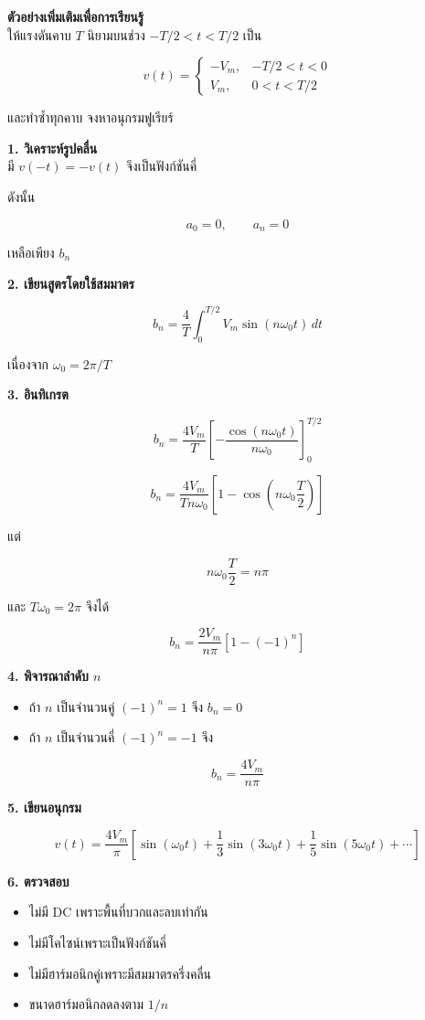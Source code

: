 \textbf{ตัวอย่างเพิ่มเติมเพื่อการเรียนรู้}\\
ให้แรงดันคาบ \(T\) นิยามบนช่วง \(-T/2<t<T/2\) เป็น

\[
v(t)=
\begin{cases}
-V_m, & -T/2<t<0\\
V_m, & 0<t<T/2
\end{cases}
\]

และทำซ้ำทุกคาบ จงหาอนุกรมฟูเรียร์

\textbf{1. วิเคราะห์รูปคลื่น}\\
มี \(v(-t)=-v(t)\) จึงเป็นฟังก์ชันคี่

ดังนั้น

\[
a_0=0,\qquad a_n=0
\]

เหลือเพียง \(b_n\)

\textbf{2. เขียนสูตรโดยใช้สมมาตร}

\[
b_n=\frac{4}{T}\int_0^{T/2}V_m\sin(n\omega_0t)\,dt
\]

เนื่องจาก \(\omega_0=2\pi/T\)

\textbf{3. อินทิเกรต}

\[
b_n=\frac{4V_m}{T}\left[-\frac{\cos(n\omega_0t)}{n\omega_0}\right]_0^{T/2}
\]

\[
b_n=\frac{4V_m}{Tn\omega_0}\left[1-\cos\left(n\omega_0\frac{T}{2}\right)\right]
\]

แต่

\[
n\omega_0\frac{T}{2}=n\pi
\]

และ \(T\omega_0=2\pi\) จึงได้

\[
b_n=\frac{2V_m}{n\pi}\left[1-(-1)^n\right]
\]

\textbf{4. พิจารณาลำดับ \(n\)}

\begin{itemize}
\item
  ถ้า \(n\) เป็นจำนวนคู่ \((-1)^n=1\) จึง \(b_n=0\)
\item
  ถ้า \(n\) เป็นจำนวนคี่ \((-1)^n=-1\) จึง
\end{itemize}

\[
b_n=\frac{4V_m}{n\pi}
\]

\textbf{5. เขียนอนุกรม}

\[
v(t)=\frac{4V_m}{\pi}\left[\sin(\omega_0t)+\frac{1}{3}\sin(3\omega_0t)+\frac{1}{5}\sin(5\omega_0t)+\cdots\right]
\]

\textbf{6. ตรวจสอบ}

\begin{itemize}
\item
  ไม่มี DC เพราะพื้นที่บวกและลบเท่ากัน
\item
  ไม่มีโคไซน์เพราะเป็นฟังก์ชันคี่
\item
  ไม่มีฮาร์มอนิกคู่เพราะมีสมมาตรครึ่งคลื่น
\item
  ขนาดฮาร์มอนิกลดลงตาม \(1/n\)
\end{itemize}

